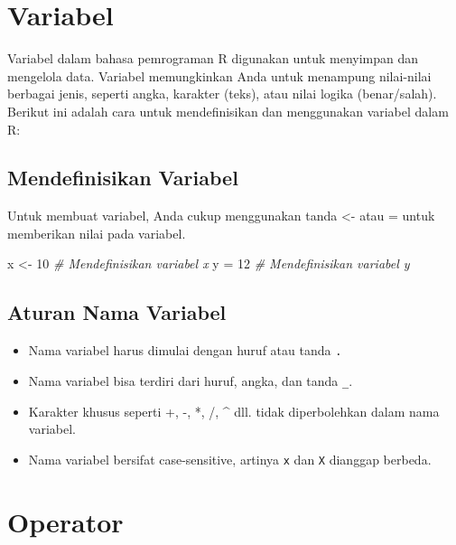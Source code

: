 \documentclass[
]{book}
\newenvironment{Shaded}{\begin{snugshade}}{\end{snugshade}}
\newcommand{\CommentTok}[1]{\textcolor[rgb]{0.56,0.35,0.01}{\textit{#1}}}
\newcommand{\DecValTok}[1]{\textcolor[rgb]{0.00,0.00,0.81}{#1}}
\newcommand{\NormalTok}[1]{#1}
\newcommand{\OtherTok}[1]{\textcolor[rgb]{0.56,0.35,0.01}{#1}}
\providecommand{\tightlist}{%
  \setlength{\itemsep}{0pt}\setlength{\parskip}{0pt}}
\begin{document}
\hypertarget{variabel}{%
\section{Variabel}\label{variabel}}

Variabel dalam bahasa pemrograman R digunakan untuk menyimpan dan mengelola data. Variabel memungkinkan Anda untuk menampung nilai-nilai berbagai jenis, seperti angka, karakter (teks), atau nilai logika (benar/salah). Berikut ini adalah cara untuk mendefinisikan dan menggunakan variabel dalam R:

\hypertarget{mendefinisikan-variabel}{%
\subsection{Mendefinisikan Variabel}\label{mendefinisikan-variabel}}

Untuk membuat variabel, Anda cukup menggunakan tanda \textless- atau = untuk memberikan nilai pada variabel.

\begin{Shaded}
\begin{Highlighting}[]
\NormalTok{x }\OtherTok{\textless{}{-}} \DecValTok{10}          \CommentTok{\# Mendefinisikan variabel x }
\NormalTok{y }\OtherTok{=} \DecValTok{12}           \CommentTok{\# Mendefinisikan variabel y}
\end{Highlighting}
\end{Shaded}

\hypertarget{aturan-nama-variabel}{%
\subsection{Aturan Nama Variabel}\label{aturan-nama-variabel}}

\begin{itemize}
\tightlist
\item
  Nama variabel harus dimulai dengan huruf atau tanda \texttt{.}
\item
  Nama variabel bisa terdiri dari huruf, angka, dan tanda \texttt{\_}.
\item
  Karakter khusus seperti +, -, *, /, \^{} dll. tidak diperbolehkan dalam nama variabel.
\item
  Nama variabel bersifat case-sensitive, artinya \texttt{x} dan \texttt{X} dianggap berbeda.
\end{itemize}

\hypertarget{operator}{%
\section{Operator}\label{operator}}
\end{document}
